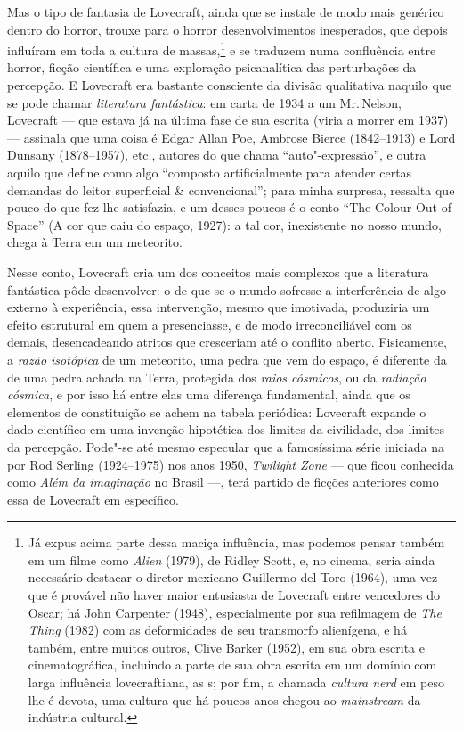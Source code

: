 Mas o tipo de fantasia de Lovecraft, ainda que se instale de modo mais
genérico dentro do horror, trouxe para o horror desenvolvimentos
inesperados, que depois influíram em toda a cultura de massas,\footnote{Já
  expus acima parte dessa maciça influência, mas podemos pensar também
  em um filme como \emph{Alien} (1979), de Ridley Scott, e, no cinema,
  seria ainda necessário destacar o diretor mexicano Guillermo del Toro
  (1964), uma vez que é provável não haver maior entusiasta de Lovecraft
  entre vencedores do Oscar; há John Carpenter (1948), especialmente por
  sua refilmagem de \emph{The Thing} (1982) com as deformidades de seu
  transmorfo alienígena, e há também, entre muitos outros, Clive Barker
  (1952), em sua obra escrita e cinematográfica, incluindo a parte de
  sua obra escrita em um domínio com larga influência lovecraftiana, as
  s; por fim, a chamada \emph{cultura nerd} em peso lhe é devota, uma
  cultura que há poucos anos chegou ao \emph{mainstream} da indústria
  cultural.} e se traduzem numa confluência entre horror, ficção
científica e uma exploração psicanalítica das perturbações da percepção.
E Lovecraft era bastante consciente da divisão qualitativa naquilo que
se pode chamar \emph{literatura fantástica}: em carta de 1934 a um Mr.\,Nelson, Lovecraft --- que estava já na última fase de sua escrita (viria
a morrer em 1937) --- assinala que uma coisa é Edgar Allan Poe, Ambrose
Bierce (1842--1913) e Lord Dunsany (1878--1957), etc., autores do que
chama ``auto"-expressão'', e outra aquilo que define como algo ``composto
artificialmente para atender certas demandas do leitor superficial \&
convencional''; para minha surpresa, ressalta que pouco do que fez lhe
satisfazia, e um desses poucos é o conto ``The Colour Out of Space'' (A
cor que caiu do espaço, 1927): a tal cor, inexistente no nosso mundo,
chega à Terra em um meteorito.

Nesse conto, Lovecraft cria um dos conceitos mais complexos que a
literatura fantástica pôde desenvolver: o de que se o mundo sofresse a
interferência de algo externo à experiência, essa intervenção, mesmo que
imotivada, produziria um efeito estrutural em quem a presenciasse, e de
modo irreconciliável com os demais, desencadeando atritos que cresceriam
até o conflito aberto. Fisicamente, a \emph{razão isotópica} de um
meteorito, uma pedra que vem do espaço, é diferente da de uma pedra
achada na Terra, protegida dos \emph{raios cósmicos}, ou da
\emph{radiação cósmica}, e por isso há entre elas uma diferença
fundamental, ainda que os elementos de constituição se achem na tabela
periódica: Lovecraft expande o dado científico em uma invenção
hipotética dos limites da civilidade, dos limites da percepção. Pode"-se
até mesmo especular que a famosíssima série iniciada na  por Rod
Serling (1924--1975) nos anos 1950, \emph{Twilight Zone} --- que ficou
conhecida como \emph{Além da imaginação} no Brasil ---, terá partido de
ficções anteriores como essa de Lovecraft em específico.

